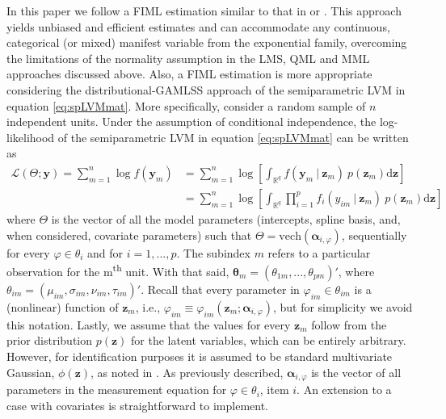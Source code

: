 \documentclass[11pt, a4paper]{article}
\newcommand{\R}{{\ensuremath{\mathbb{R}}}}
\newcommand{\cond}{\!~|~\!}
\begin{document}
In this paper we follow a FIML estimation similar to that in \citet{Rizopoulos&Moustaki_BJMSP2008} or \citet{JinEtAl_SEM2020}. This approach yields unbiased and efficient estimates and can accommodate any continuous, categorical (or mixed) manifest variable from the exponential family, overcoming the limitations of the normality assumption in the LMS, QML and MML approaches discussed above. Also, a FIML estimation is more appropriate considering the distributional-GAMLSS approach of the semiparametric LVM in equation \eqref{eq:spLVMmat}. More specifically, consider a random sample of $n$ independent units. Under the assumption of conditional independence, the log-likelihood of the semiparametric LVM in equation \eqref{eq:spLVMmat} can be written as
\begin{align}
\mathcal{L}(\Theta; \mathbf{y}) = \sum_{m=1}^{n} \log f(\mathbf{y}_m) & = \sum_{m=1}^{n} \log \left[\int_{\R^q} f(\mathbf{y}_m \cond \mathbf{z}_m)~p(\mathbf{z}_m) \text{d}\mathbf{z}\right] \nonumber \\ & = \sum_{m=1}^{n} \log \left[\int_{\R^q} \prod_{i=1}^p f_i(y_{im} \cond \mathbf{z}_m)~p(\mathbf{z}_m) \text{d}\mathbf{z}\right] \label{eq:logLik}
\end{align}
where $\Theta$ is the vector of all the model parameters (intercepts, spline basis, and, when considered, covariate parameters) such that $\Theta = \mathrm{vech}(\bm{\alpha}_{i,\varphi})$, sequentially for every $\varphi \in \theta_i$ and for $i = 1,...,p$. The subindex $m$ refers to a particular observation for the m\textsuperscript{th} unit. With that said, $\bm{\theta}_m = (\theta_{1m},...,\theta_{pm})'$, where $\theta_{im} = (\mu_{im}, \sigma_{im}, \nu_{im}, \tau_{im})'$. Recall that every parameter in $\varphi_{im} \in \theta_{im}$ is a (nonlinear) function of $\mathbf{z}_{m}$, i.e., $\varphi_{im} \equiv \varphi_{im}(\mathbf{z}_{m} ; \bm{\alpha}_{i,\varphi})$, but for simplicity we avoid this notation. Lastly, we assume that the values for every $\mathbf{z}_m$ follow from the prior distribution $p(\mathbf{z})$ for the latent variables, which can be entirely arbitrary. However, for identification purposes it is assumed to be standard multivariate Gaussian, $\phi(\mathbf{z})$, as noted in \citet{Bartholomew_Biometrika1984}. As previously described, $\bm{\alpha}_{i, \varphi}$ is the vector of all parameters in the measurement equation for $\varphi \in \theta_i$, item $i$. An extension to a case with covariates is straightforward to implement.
\end{document}
